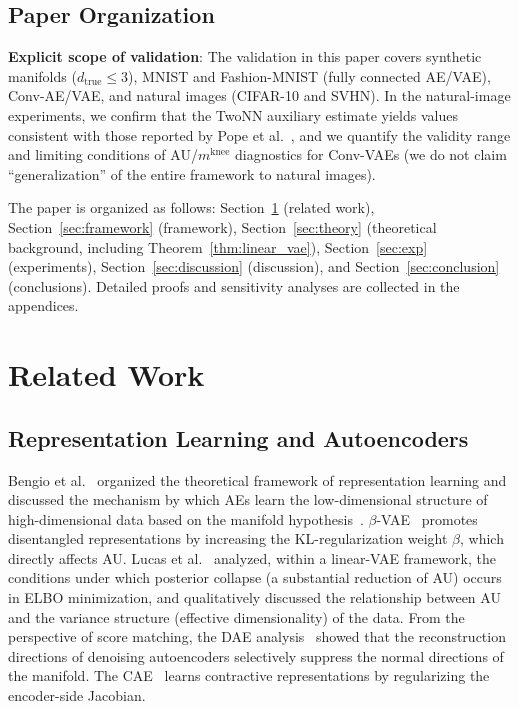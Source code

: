 \documentclass[make,article,submit,pdftex,moreauthors]{Definitions/mdpi}
\newcommand{\mknee}{m^{\mathrm{knee}}}
\begin{document}
\subsection{Paper Organization}\label{sec:intro_structure}

\textbf{Explicit scope of validation}:
The validation in this paper covers synthetic manifolds
($d_{\mathrm{true}} \leq 3$), MNIST and Fashion-MNIST (fully connected AE/VAE),
Conv-AE/VAE, and natural images (CIFAR-10 and SVHN).
In the natural-image experiments, we confirm that the TwoNN auxiliary estimate
yields values consistent with those reported by
Pope et al.~\cite{pope2021intrinsic}, and we quantify the validity range and
limiting conditions of AU/$\mknee$ diagnostics for Conv-VAEs
(we do not claim ``generalization'' of the entire framework to natural images).

The paper is organized as follows:
Section~\ref{sec:related} (related work), Section~\ref{sec:framework} (framework),
Section~\ref{sec:theory} (theoretical background, including Theorem~\ref{thm:linear_vae}),
Section~\ref{sec:exp} (experiments), Section~\ref{sec:discussion} (discussion),
and Section~\ref{sec:conclusion} (conclusions).
Detailed proofs and sensitivity analyses are collected in the appendices.

\section{Related Work}\label{sec:related}

\subsection{Representation Learning and Autoencoders}\label{sec:related_ae}

Bengio et al.~\cite{bengio2013representation} organized the theoretical
framework of representation learning and discussed the mechanism by which AEs
learn the low-dimensional structure of high-dimensional data based on the
manifold hypothesis~\cite{fefferman2016manifold}.
$\beta$-VAE~\cite{higgins2017betavae} promotes disentangled representations by
increasing the KL-regularization weight $\beta$, which directly affects AU.
Lucas et al.~\cite{lucas2019elbo} analyzed, within a linear-VAE framework, the
conditions under which posterior collapse (a substantial reduction of AU)
occurs in ELBO minimization, and qualitatively discussed the relationship
between AU and the variance structure (effective dimensionality) of the data.
From the perspective of score matching, the DAE analysis~\cite{alain2014dae}
showed that the reconstruction directions of denoising autoencoders selectively
suppress the normal directions of the manifold.
The CAE~\cite{rifai2011cae} learns contractive representations by regularizing
the encoder-side Jacobian.
\end{document}

